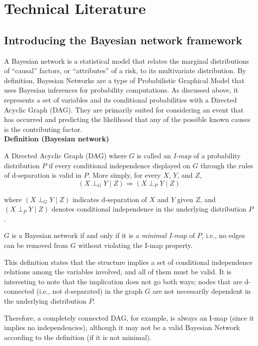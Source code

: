 \section{Technical Literature}
\subsection{Introducing the Bayesian network framework}
A Bayesian network is a statistical model that relates the marginal distributions of “causal” factors, or “attributes” of a risk, to its multivariate distribution. By definition, Bayesian Networks are a type of Probabilistic Graphical Model that uses Bayesian inferences for probability computations. As discussed above, it represents a set of variables and its conditional probabilities with a Directed Acyclic Graph (DAG). They are primarily suited for considering an event that has occurred and predicting the likelihood that any of the possible known causes is the contributing factor.\\
\textbf{Definition (Bayesian network)}

A Directed Acyclic Graph (DAG) where $G$ is called an \emph{I-map} of a probability distribution $P$ if every conditional independence displayed on $G$ through the rules of d-separation is valid in $P$. More simply, for every $X$, $Y$, and $Z$,
\begin{equation}
(X \perp_G Y \mid Z) \Rightarrow (X \perp_P Y \mid Z)
\end{equation}

where $(X \perp_G Y \mid Z)$ indicates d-separation of $X$ and $Y$ given $Z$, and $(X \perp_P Y \mid Z)$ denotes conditional independence in the underlying distribution $P$.

$G$ is a Bayesian network if and only if it is a \emph{minimal I-map} of $P$, i.e., no edges can be removed from $G$ without violating the I-map property.

This definition states that the structure implies a set of conditional independence relations among the variables involved, and all of them must be valid. It is interesting to note that the implication does not go both ways; nodes that are d-connected (i.e., not d-separated) in the graph $G$ are not necessarily dependent in the underlying distribution $P$.

Therefore, a completely connected DAG, for example, is always an I-map (since it implies no independencies), although it may not be a valid Bayesian Network according to the definition (if it is not minimal).

